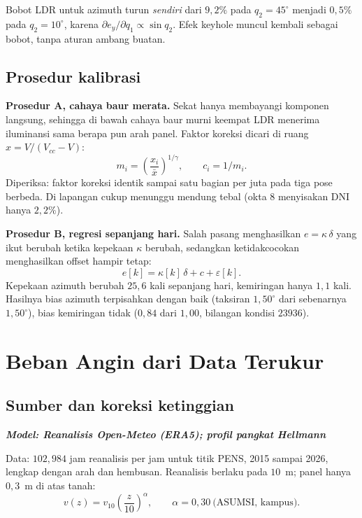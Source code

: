 \documentclass[11pt,a4paper]{article}
\newcommand{\degg}{^\circ}
\newcommand{\model}[1]{\textbf{\textit{Model: #1}}}
\begin{document}
Bobot LDR untuk azimuth turun \emph{sendiri} dari $9{,}2\%$ pada $q_2 = 45\degg$ menjadi $0{,}5\%$ pada
$q_2 = 10\degg$, karena $\partial e_y/\partial q_1 \propto \sin q_2$. Efek keyhole muncul kembali sebagai
bobot, tanpa aturan ambang buatan.

\subsection{Prosedur kalibrasi}

\textbf{Prosedur A, cahaya baur merata.} Sekat hanya membayangi komponen langsung, sehingga di bawah cahaya
baur murni keempat LDR menerima iluminansi sama berapa pun arah panel. Faktor koreksi dicari di ruang
$x = V/(V_{cc}-V)$:
\begin{equation}
m_i = \left( \frac{x_i}{\bar{x}} \right)^{1/\gamma}, \qquad c_i = 1/m_i .
\end{equation}
Diperiksa: faktor koreksi identik sampai satu bagian per juta pada tiga pose berbeda. Di lapangan cukup
menunggu mendung tebal (okta 8 menyisakan DNI hanya $2{,}2\%$).

\textbf{Prosedur B, regresi sepanjang hari.} Salah pasang menghasilkan $e = \kappa\,\delta$ yang ikut
berubah ketika kepekaan $\kappa$ berubah, sedangkan ketidakcocokan menghasilkan offset hampir tetap:
\begin{equation}
e[k] = \kappa[k]\,\delta + c + \varepsilon[k].
\end{equation}
Kepekaan azimuth berubah $25{,}6$ kali sepanjang hari, kemiringan hanya $1{,}1$ kali. Hasilnya bias azimuth
terpisahkan dengan baik (taksiran $1{,}50\degg$ dari sebenarnya $1{,}50\degg$), bias kemiringan tidak
($0{,}84$ dari $1{,}00$, bilangan kondisi $23936$).

\section{Beban Angin dari Data Terukur}

\subsection{Sumber dan koreksi ketinggian}

\model{Reanalisis Open-Meteo (ERA5); profil pangkat Hellmann}

Data: $102{,}984$ jam reanalisis per jam untuk titik PENS, 2015 sampai 2026, lengkap dengan arah dan
hembusan. Reanalisis berlaku pada $10$~m; panel hanya $0{,}3$~m di atas tanah:
\begin{equation}
v(z) = v_{10}\left( \frac{z}{10} \right)^{\alpha}, \qquad \alpha = 0{,}30 \ \text{(ASUMSI, kampus)}.
\end{equation}
\end{document}
